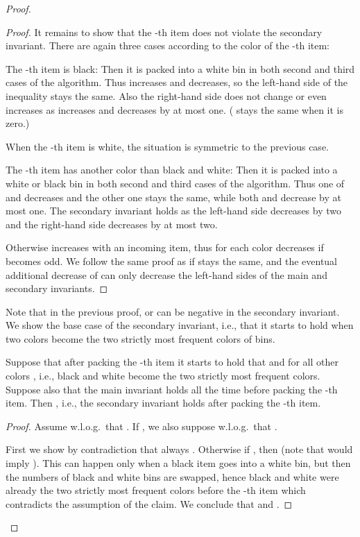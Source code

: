 \documentclass[11pt,a4paper]{article}
\begin{document}
\begin{proof}
\begin{proof}
It remains to show that the -th item does not violate the secondary invariant.
There are again three cases according to the color of the -th item:
\begin{compactitem}
\item The -th item is black: Then it is packed into a white bin in both second and third cases of the algorithm.
Thus  increases and  decreases,
so the left-hand side of the inequality stays the same.
Also the right-hand side does not change or even increases as  increases
and  decreases by at most one. ( stays the same when it is zero.)
\item When the -th item is white, the situation is symmetric to the previous case.
\item The -th item has another color than black and white:
Then it is packed into a white or black bin in both second and third cases of the algorithm.
Thus one of  and  decreases and the other one stays the same,
while both  and  decrease by at most one.
The secondary invariant holds as the left-hand side decreases by two
and the right-hand side decreases by at most two.
\end{compactitem}

Otherwise  increases with an incoming item, thus  for each color  decreases
if  becomes odd. We follow the same proof as if  stays the same,
and the eventual additional decrease of 
can only decrease the left-hand sides of the main and secondary
invariants.
\end{proof}

Note that in the previous proof,  or 
can be negative in the secondary invariant.
We show the base case of the secondary invariant, i.e., that it
starts to hold when two colors become the two strictly most frequent
colors of bins.

\begin{claim}  \label{clm:OptAlgBaseCaseSecondary}
Suppose that after packing the -th item it starts to hold that
 and  for all other colors , i.e.,
black and white become the two strictly most frequent colors.
Suppose also that the main invariant holds all the time before packing the -th item.
Then ,
i.e., the secondary invariant holds after packing the -th item.
\end{claim}

\begin{proof}
Assume w.l.o.g.\ that .
If , we also suppose w.l.o.g.\ that .

First we show by contradiction that always . Otherwise if , then 
(note that  would imply ).
This can happen only when a black item goes into a white bin, but then the numbers of black and white bins are swapped, hence black
and white were already the two strictly most frequent colors before the -th item
which contradicts the assumption of the claim.
We conclude that  and .


\end{proof}
\end{proof}
\end{document}
